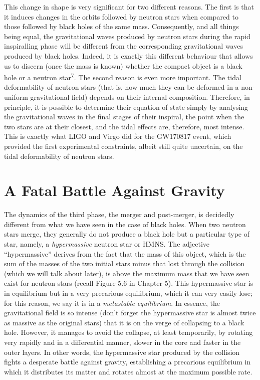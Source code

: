 This change in shape is very significant for two different reasons. The first is that it
induces changes in the orbits followed by neutron stars when compared to those followed
by black holes of the same mass. Consequently, and all things being equal, the
gravitational waves produced by neutron stars during the rapid inspiralling phase will
be different from the corresponding gravitational waves produced by black holes. Indeed,
it is exactly this different behaviour that allows us to discern (once the mass is
known) whether the compact object is a black hole or a neutron star\textsuperscript{\hyperlink{note:08-07}{7}}.
The second reason is even more important. The tidal deformability of neutron stars (that
is, how much they can be deformed in a non-uniform gravitational field) depends on their
internal composition. Therefore, in principle, it is possible to determine their
equation of state simply by analysing the gravitational waves in the
final stages of their inspiral, the point when the two stars are at their closest, and
the tidal effects are, therefore, most intense. This is exactly what LIGO and Virgo did
for the GW170817 event, which provided the first experimental
constraints, albeit still quite uncertain, on the tidal deformability of neutron stars.

\section{A Fatal Battle Against Gravity}\label{sec:08-remnant}

The dynamics of the third phase, the merger and post-merger, is
decidedly different from what we have seen in the case of black holes. When two neutron
stars merge, they generally do not produce a black hole but a particular type of star,
namely, a \emph{hypermassive} neutron star or HMNS. The adjective
``hypermassive'' derives from the fact that the mass of this object, which is the sum of
the masses of the two initial stars minus that lost through the collision (which we will
talk about later), is above the maximum mass that we have seen exist for neutron stars
(recall Figure 5.6 in Chapter 5). This hypermassive star is in equilibrium but in a very
precarious equilibrium, which it can very easily lose; for this reason, we say it is in
a \emph{metastable equilibrium}. In essence, the gravitational field
is so intense (don't forget the hypermassive star is almost twice as massive as the
original stars) that it is on the verge of collapsing to a black hole. However, it
manages to avoid the collapse, at least temporarily, by rotating very rapidly and in a
differential manner, slower in the core and faster in the outer
layers. In other words, the hypermassive star produced by the collision fights a
desperate battle against gravity, establishing a precarious equilibrium in which it
distributes its matter and rotates almost at the maximum possible rate.

